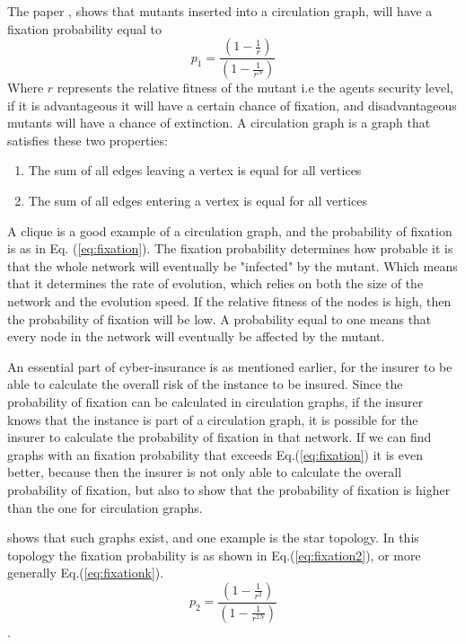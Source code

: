 The paper \cite{lieberman2005evolutionary}, shows that mutants inserted into a circulation graph, will have a fixation probability equal to
\begin{equation}  
p_{1}=\frac{(1-\frac{1}{r})}{(1-\frac{1}{r^{N}})}
 \label{eq:fixation} 
\end{equation}
Where $r$ represents the relative fitness of the mutant i.e the agents security level, if it is advantageous it will have a certain chance of fixation, and disadvantageous mutants will have a chance of extinction. A circulation graph is a graph that satisfies these two properties: 
\begin{enumerate}
\item The sum of all edges leaving a vertex is equal for all vertices
\item The sum of all edges entering a vertex is equal for all vertices
\end{enumerate}
A clique is a good example of a circulation graph, and the probability of fixation is as in Eq. (\ref{eq:fixation}).
The fixation probability determines how probable it is that the whole network will eventually be
"infected" by the mutant. Which means that it determines the rate of evolution, which relies on both the size of the
network and the evolution speed. 
If the relative fitness of the nodes is high, then the probability of fixation will be low.
A probability equal to one means that every node in the network will eventually be affected by the mutant.

An essential part of cyber-insurance is as mentioned earlier, for the insurer to be able to calculate the overall risk of the instance to be insured. Since the probability of fixation can be calculated in circulation graphs, if the insurer knows that the instance is part of a circulation graph, it is possible for the insurer to calculate the probability of fixation in that network. 
If we can find graphs with an fixation probability that exceeds Eq.(\ref{eq:fixation}) it is even better, because then the insurer is not only able to calculate the overall probability of fixation, but also to show that the probability of fixation is higher than the one for circulation graphs.

\cite{lieberman2005evolutionary} shows that such graphs exist, and one example is the star topology.
In this topology the fixation probability is as shown in Eq.(\ref{eq:fixation2}), or more generally Eq.(\ref{eq:fixationk}). \begin{equation}p_{2}=\frac{(1-\frac{1}{r^{2}})}{(1-\frac{1}{r^{2N}})} \label{eq:fixation2} \end{equation}.

